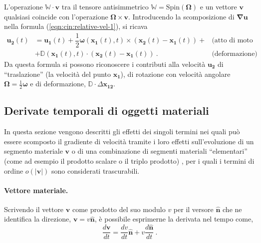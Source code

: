  L'operazione $\mathbb{W} \cdot \bm{v}$ tra il tensore antisimmetrico $\mathbb{W}=\text{Spin}(\bm{\Omega})$ e un vettore $\bm{v}$ qualsiasi coincide con l'operazione $\bm{\Omega} \times \bm{v}$.
Introducendo la scomposizione di $\bm{\nabla} \bm{u}$ nella formula (\ref{eqn:cin:relative-vel-1}), si ricava
\begin{equation}
\begin{aligned}
 \bm{u_2}(t) & = \bm{u_1}(t) + \dfrac{1}{2}\bm{\omega}(\bm{x_1}(t),t) \times (\bm{x_2}(t) - \bm{x_1}(t) ) +  & \text{(atto di moto rigido)} \\ 
& + \mathbb{D}(\bm{x_1}(t),t) \cdot (\bm{x_2}(t) - \bm{x_1}(t)) \ . & \text{(deformazione)}
\end{aligned}
\end{equation}
Da questa formula si possono riconoscere i contributi alla velocità $\bm{u_2}$ di ``traslazione'' (la velocità del punto $\bm{x_1}$), di rotazione con velocità angolare $\bm{\Omega} = \frac{1}{2} \bm{\omega}$ e di deformazione, $\mathbb{D} \cdot \Delta\bm{x_{12}}$.

\subsection{Derivate temporali di oggetti materiali}
In questa sezione vengono descritti gli effetti dei singoli termini nei quali può essere scomposto il gradiente di velocità tramite i loro effetti sull'evoluzione di un segmento materiale $\bm{v}$ o di una combinazione di segmenti materiali ``elementari'' (come ad esempio il prodotto scalare o il triplo prodotto)	, per i quali i termini di ordine $o(|\bm{v}|)$ sono considerati trascurabili.

\paragraph{Vettore materiale.}
Scrivendo il vettore $\bm{v}$ come prodotto del suo modulo $v$ per il versore $\bm{\hat{n}}$ che ne identifica la direzione, $\bm{v} = v \bm{\hat{n}}$, è possibile esprimerne la derivata nel tempo come,
\begin{equation}\label{eqn:cin:dvvec}
 \dfrac{d \bm{v}}{dt} = \dfrac{dv}{dt}\bm{\hat{n}} + v \dfrac{d \bm{\hat{n}}}{d t} \ .
\end{equation}


